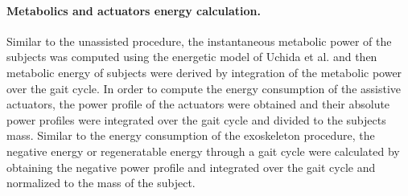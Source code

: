 \documentclass[10pt,letterpaper]{article}
\begin{document}
\paragraph*{Metabolics and actuators energy calculation.} Similar to the unassisted procedure, the instantaneous metabolic power of the subjects was computed using the energetic model of Uchida et al. \cite{106} and then metabolic energy of subjects were derived by integration of the metabolic power over the gait cycle. In order to compute the energy consumption of the assistive actuators, the power profile of the actuators were obtained and their absolute power profiles were integrated over the gait cycle and divided to the subjects mass. Similar to the energy consumption of the exoskeleton procedure, the negative energy or regeneratable energy through a gait cycle were calculated by obtaining the negative power profile and integrated over the gait cycle and normalized to the mass of the subject.\\
\end{document}
